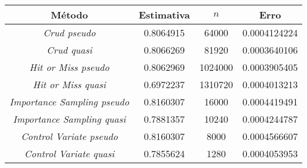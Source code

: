 \documentclass{article}
\begin{document}
\begin{center}
\begin{tabular}{ |c|c|c|c| } 
 \hline
 Método                       & Estimativa & $n$  & Erro \\ 
 \hline
 \textit{Crud pseudo}                & 0.8064915  & 64000  & 0.0004124224 \\ 
 \textit{Crud quasi}                 & 0.8066269  & 81920  & 0.0003640106 \\ 
 \hline
 \textit{Hit or Miss pseudo}         & 0.8062969  & 1024000 & 0.0003905405 \\
 \textit{Hit or Miss quasi}          & 0.6972237  & 1310720 & 0.0004013213 \\
 \hline
 \textit{Importance Sampling pseudo} & 0.8160307  & 16000  & 0.0004419491 \\
 \textit{Importance Sampling quasi}  & 0.7881357  & 10240    &  0.0004244787\\
 \hline
 \textit{Control Variate pseudo}     & 0.8160307  & 8000  & 0.0004566607 \\
  \textit{Control Variate quasi}     & 0.7855624  & 1280 & 0.0004053953 \\
 \hline
\end{tabular}
\end{center}

%
%
\end{document}
